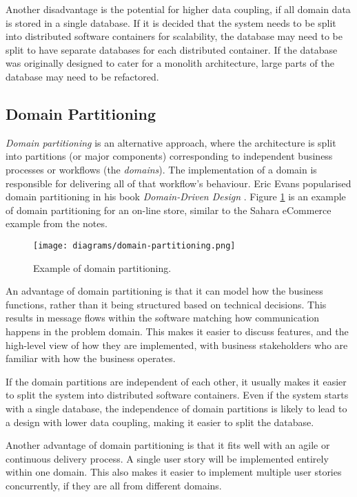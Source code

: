 Another disadvantage is the potential for higher data coupling, if all domain data is stored in a single database.
If it is decided that the system needs to be split into distributed software containers for scalability,
the database may need to be split to have separate databases for each distributed container.
If the database was originally designed to cater for a monolith architecture, large parts of the database may need to be refactored.

\subsection{Domain Partitioning}
\emph{Domain partitioning} is an alternative approach, where the architecture is split into partitions (or major components)
corresponding to independent business processes or workflows (the \emph{domains}).
The implementation of a domain is responsible for delivering all of that workflow's behaviour.
Eric Evans popularised domain partitioning in his book \textit{Domain-Driven Design} \cite{ddd-evans}.
Figure \ref{fig:domain-partitioning} is an example of domain partitioning for an on-line store, similar to the
Sahara eCommerce example from the  notes.

\begin{figure}[h!]
    \centering
    \texttt{[image: diagrams/domain-partitioning.png]}
    \caption{Example of domain partitioning.}
    \label{fig:domain-partitioning}
\end{figure}

An advantage of domain partitioning is that it can model how the business functions, rather than it being structured based on technical decisions.
This results in message flows within the software matching how communication happens in the problem domain.
This makes it easier to discuss features, and the high-level view of how they are implemented, with business stakeholders who are familiar with how the business operates.

If the domain partitions are independent of each other, it usually makes it easier to split the system into distributed software containers.
Even if the system starts with a single database, the independence of domain partitions is likely to lead to a design with lower data coupling,
making it easier to split the database.

Another advantage of domain partitioning is that it fits well with an agile or continuous delivery process.
A single user story will be implemented entirely within one domain.
This also makes it easier to implement multiple user stories concurrently, if they are all from different domains.

